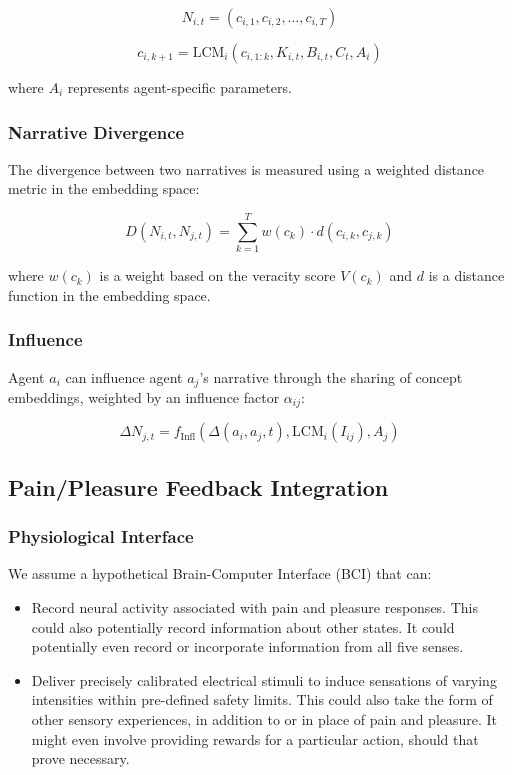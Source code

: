 \documentclass[12pt, a4paper]{article}
\begin{document}
\begin{equation}
N_{i,t} = (c_{i,1}, c_{i,2}, \ldots, c_{i,T})
\end{equation}

\begin{equation}
c_{i,k+1} = \text{LCM}_i(c_{i,1:k}, K_{i,t}, B_{i,t}, C_t, A_i)
\end{equation}

where $A_i$ represents agent-specific parameters.


\subsubsection{Narrative Divergence}
The divergence between two narratives is measured using a weighted distance metric in the embedding space:

\begin{equation}
D(N_{i,t}, N_{j,t}) = \sum_{k=1}^T w(c_k) \cdot d(c_{i,k}, c_{j,k})
\end{equation}

where $w(c_k)$ is a weight based on the veracity score $V(c_k)$ and $d$ is a distance function in the embedding space.



\subsubsection{Influence}
Agent $a_i$ can influence agent $a_j$'s narrative through the sharing of concept embeddings, weighted by an influence factor $\alpha_{ij}$:

\begin{equation}
\Delta N_{j,t} = f_{\text{Infl}}(\Delta(a_i, a_j, t), \text{LCM}_i(I_{ij}), A_j)
\end{equation}


 

\subsection{Pain/Pleasure Feedback Integration}

\subsubsection{Physiological Interface}
We assume a hypothetical Brain-Computer Interface (BCI) that can:
\begin{itemize}
    \item Record neural activity associated with pain and pleasure responses. This could also potentially record information about other states. It could potentially even record or incorporate information from all five senses.
    \item Deliver precisely calibrated electrical stimuli to induce sensations of varying intensities within pre-defined safety limits. This could also take the form of other sensory experiences, in addition to or in place of pain and pleasure. It might even involve providing rewards for a particular action, should that prove necessary.
\end{itemize}
\end{document}
